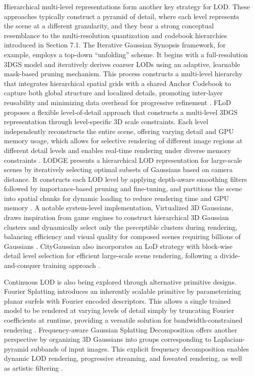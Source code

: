\documentclass[11pt]{article}
\begin{document}
Hierarchical multi-level representations form another key strategy for LOD. These approaches typically construct a pyramid of detail, where each level represents the scene at a different granularity, and they bear a strong conceptual resemblance to the multi-resolution quantization and codebook hierarchies introduced in Section 7.1. The Iterative Gaussian Synopsis framework, for example, employs a top-down ``unfolding'' scheme. It begins with a full-resolution 3DGS model and iteratively derives coarser LODs using an adaptive, learnable mask-based pruning mechanism. This process constructs a multi-level hierarchy that integrates hierarchical spatial grids with a shared Anchor Codebook to capture both global structure and localized details, promoting inter-layer reusability and minimizing data overhead for progressive refinement \cite{ref454}. FLoD proposes a flexible level-of-detail approach that constructs a multi-level 3DGS representation through level-specific 3D scale constraints. Each level independently reconstructs the entire scene, offering varying detail and GPU memory usage, which allows for selective rendering of different image regions at different detail levels and enables real-time rendering under diverse memory constraints \cite{ref455}. LODGE presents a hierarchical LOD representation for large-scale scenes by iteratively selecting optimal subsets of Gaussians based on camera distance. It constructs each LOD level by applying depth-aware smoothing filters followed by importance-based pruning and fine-tuning, and partitions the scene into spatial chunks for dynamic loading to reduce rendering time and GPU memory \cite{ref456}. A notable system-level implementation, Virtualized 3D Gaussians, draws inspiration from game engines to construct hierarchical 3D Gaussian clusters and dynamically select only the perceptible clusters during rendering, balancing efficiency and visual quality for composed scenes requiring billions of Gaussians \cite{ref457}. CityGaussian also incorporates an LoD strategy with block-wise detail level selection for efficient large-scale scene rendering, following a divide-and-conquer training approach \cite{ref458}.

Continuous LOD is also being explored through alternative primitive designs. Fourier Splatting introduces an inherently scalable primitive by parameterizing planar surfels with Fourier encoded descriptors. This allows a single trained model to be rendered at varying levels of detail simply by truncating Fourier coefficients at runtime, providing a versatile solution for bandwidth-constrained rendering \cite{ref65}. Frequency-aware Gaussian Splatting Decomposition offers another perspective by organizing 3D Gaussians into groups corresponding to Laplacian-pyramid subbands of input images. This explicit frequency decomposition enables dynamic LOD rendering, progressive streaming, and foveated rendering, as well as artistic filtering \cite{ref145}.
\end{document}
